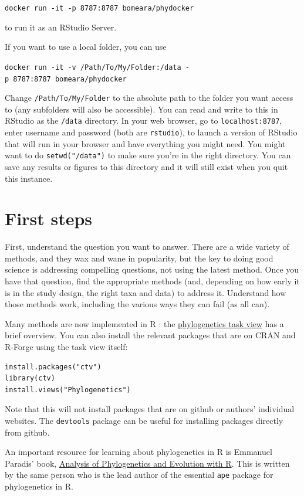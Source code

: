 \documentclass[]{book}
\theoremstyle{definition}
\theoremstyle{definition}
\theoremstyle{remark}
\begin{document}
\texttt{docker\ run\ -it\ -p\ 8787:8787\ bomeara/phydocker}

to run it as an RStudio Server.

If you want to use a local folder, you can use

\texttt{docker\ run\ -it\ -v\ /Path/To/My/Folder:/data\ -p\ 8787:8787\ bomeara/phydocker}

Change \texttt{/Path/To/My/Folder} to the absolute path to the folder
you want access to (any subfolders will also be accessible). You can
read and write to this in RStudio as the \texttt{/data} directory. In
your web browser, go to \texttt{localhost:8787}, enter username and
password (both are \texttt{rstudio}), to launch a version of RStudio
that will run in your browser and have everything you might need. You
might want to do \texttt{setwd("/data")} to make sure you're in the
right directory. You can save any results or figures to this directory
and it will still exist when you quit this instance.

\chapter{First steps}\label{first-steps}

First, understand the question you want to answer. There are a wide
variety of methods, and they wax and wane in popularity, but the key to
doing good science is addressing compelling questions, not using the
latest method. Once you have that question, find the appropriate methods
(and, depending on how early it is in the study design, the right taxa
and data) to address it. Understand how those methods work, including
the various ways they can fail (as all can).

Many methods are now implemented in R \citep{R-base}: the
\href{http://cran.r-project.org/web/views/Phylogenetics.html}{phylogenetics
task view} has a brief overview. You can also install the relevant
packages that are on CRAN and R-Forge using the task view itself:

\begin{verbatim}
install.packages("ctv")
library(ctv)
install.views("Phylogenetics")
\end{verbatim}

Note that this will not install packages that are on github or authors'
individual websites. The \texttt{devtools} package can be useful for
installing packages directly from github.

An important resource for learning about phylogenetics in R is Emmanuel
Paradis' book,
\href{http://www.springer.com/us/book/9781461417422}{Analysis of
Phylogenetics and Evolution with R}. This is written by the same person
who is the lead author of the essential \texttt{ape} package for
phylogenetics in R.
\end{document}
